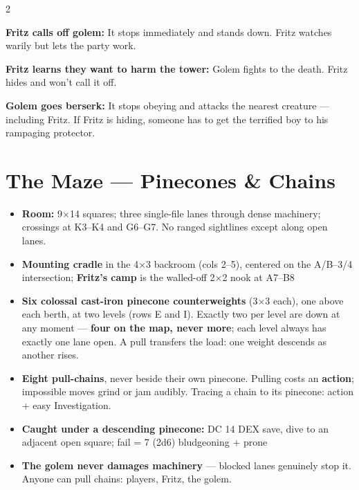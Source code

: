 \documentclass[10pt,letterpaper]{article}
\begin{document}
\begin{multicols}{2}
\vspace{4pt}

\textbf{Fritz calls off golem:} It stops immediately and stands down. Fritz watches warily but lets the party work.

\textbf{Fritz learns they want to harm the tower:} Golem fights to the death. Fritz hides and won't call it off.

\textbf{Golem goes berserk:} It stops obeying and attacks the nearest creature --- including Fritz. If Fritz is hiding, someone has to get the terrified boy to his rampaging protector.

\columnbreak

\section*{The Maze --- Pinecones \& Chains}
\begin{itemize}
\item \textbf{Room:} 9$\times$14 squares; three single-file lanes through dense machinery; crossings at K3--K4 and G6--G7. No ranged sightlines except along open lanes.
\item \textbf{Mounting cradle} in the 4$\times$3 backroom (cols 2--5), centered on the A/B--3/4 intersection; \textbf{Fritz's camp} is the walled-off 2$\times$2 nook at A7--B8
\item \textbf{Six colossal cast-iron pinecone counterweights} (3$\times$3 each), one above each berth, at two levels (rows E and I). Exactly two per level are down at any moment --- \textbf{four on the map, never more}; each level always has exactly one lane open. A pull transfers the load: one weight descends as another rises.
\item \textbf{Eight pull-chains}, never beside their own pinecone. Pulling costs an \textbf{action}; impossible moves grind or jam audibly. Tracing a chain to its pinecone: action + easy Investigation.
\item \textbf{Caught under a descending pinecone:} DC 14 DEX save, dive to an adjacent open square; fail = 7 (2d6) bludgeoning + prone
\item \textbf{The golem never damages machinery} --- blocked lanes genuinely stop it. Anyone can pull chains: players, Fritz, the golem.
\end{itemize}


\end{multicols}
\end{document}
